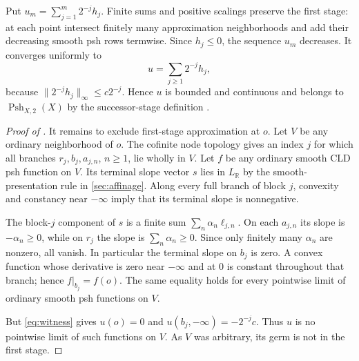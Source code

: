 \documentclass[11pt,a4paper]{amsart}
\begin{document}
Put $u_m=\sum_{j=1}^{m}2^{-j}h_j$. Finite sums and positive scalings preserve the first stage: at each point intersect finitely many approximation neighborhoods and add their decreasing smooth psh rows termwise. Since $h_j\leq0$, the sequence $u_m$ decreases. It converges uniformly to
\begin{equation}\label{eq:witness}
 u=\sum_{j\geq1}2^{-j}h_j,
\end{equation}
because $\|2^{-j}h_j\|_\infty\leq c2^{-j}$. Hence $u$ is bounded and continuous and belongs to $\operatorname{Psh}_{X,2}(X)$ by the successor-stage definition \cite[Definition~8.1.1]{CLD12}.

\begin{proof}[Proof of ]
It remains to exclude first-stage approximation at $o$. Let $V$ be any ordinary neighborhood of $o$. The cofinite node topology gives an index $j$ for which all branches $r_j,b_j,a_{j,n}$, $n\geq1$, lie wholly in $V$. Let $f$ be any ordinary smooth CLD psh function on $V$. Its terminal slope vector $s$ lies in $L_{\mathbb R}$ by the smooth-presentation rule in \cref{sec:affinage}. Along every full branch of block $j$, convexity and constancy near $-\infty$ imply that its terminal slope is nonnegative.

The block-$j$ component of $s$ is a finite sum $\sum_n\alpha_n\ell_{j,n}$. On each $a_{j,n}$ its slope is $-\alpha_n\geq0$, while on $r_j$ the slope is $\sum_n\alpha_n\geq0$. Since only finitely many $\alpha_n$ are nonzero, all vanish. In particular the terminal slope on $b_j$ is zero. A convex function whose derivative is zero near $-\infty$ and at $0$ is constant throughout that branch; hence $f|_{b_j}=f(o)$. The same equality holds for every pointwise limit of ordinary smooth psh functions on $V$.

But \eqref{eq:witness} gives $u(o)=0$ and $u(b_j,-\infty)=-2^{-j}c$. Thus $u$ is no pointwise limit of such functions on $V$. As $V$ was arbitrary, its germ is not in the first stage.
\end{proof}

\printbibliography
\end{document}
